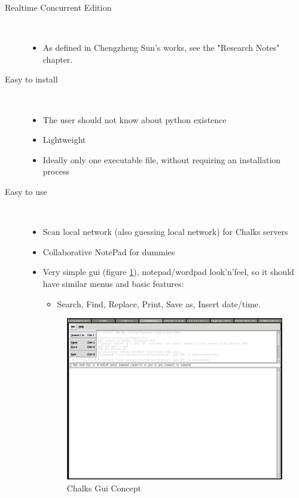 \documentclass{report}
\begin{document}
\begin{description}

\item [Realtime Concurrent Edition] \hspace{0cm} \\
    \begin{itemize}
    \item As defined in Chengzheng Sun's works, see the "Research Notes" chapter.
    \end{itemize}
    
\item [Easy to install] \hspace{0cm} \\
    \begin{itemize}
    \item The user should not know about python existence
    \item Lightweight
    \item Ideally only one executable file, without requiring an installation process
    \end{itemize}
    
\item [Easy to use] \hspace{0cm} \\
    \begin{itemize}
    \item Scan local network (also guessing local network) for Chalks servers
    \item Collaborative NotePad for dummies
    \item Very simple gui (figure \ref{fig:chalksguiconcept}), notepad/wordpad look'n'feel, so it should have similar menus and basic features:
      \begin{itemize}
      \item Search, Find, Replace, Print, Save as, Insert date/time.
      \end{itemize}

\begin{figure}[htbp]
 \begin{center}
    \includegraphics[angle=0,width=0.5\linewidth]{schemas/chalks_gui_concept.png}
 \end{center}
 \caption{Chalks Gui Concept}
  \label{fig:chalksguiconcept}
\end{figure}
      

\end{itemize}
\end{description}
\end{document}
